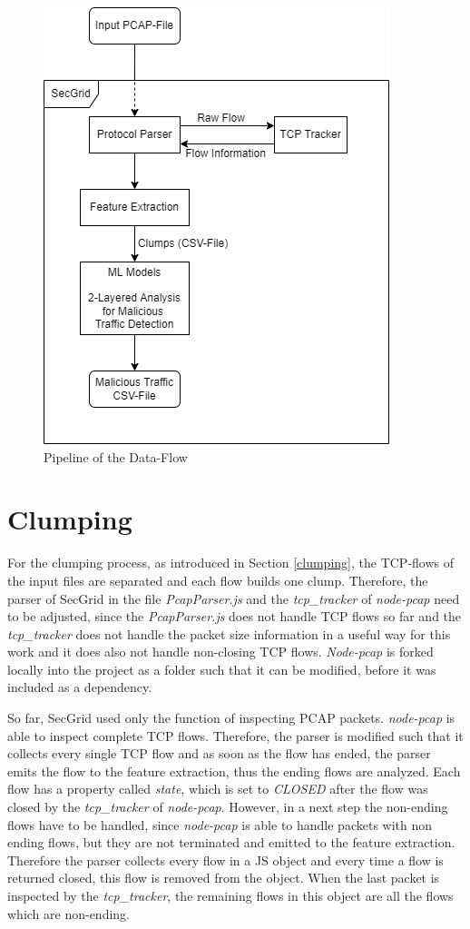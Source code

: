 \begin{figure} [h]
\includegraphics[scale=0.5]{images/pipeline.png}
\centering
\caption{Pipeline of the Data-Flow}
\label{fig:pipeline}
\end{figure}

\section{Clumping} \label{impl_clumping}
For the clumping process, as introduced in Section \ref{clumping}, the TCP-flows of the input files are separated and each flow builds one clump. Therefore, the parser of SecGrid in the file \textit{PcapParser.js} and the \textit{tcp\_tracker} of \textit{node-pcap} need to be adjusted, since the \textit{PcapParser.js} does not handle TCP flows so far and the \textit{tcp\_tracker} does not handle the packet size information in a useful way for this work and it does also not handle non-closing TCP flows. \textit{Node-pcap} is forked locally into the project as a folder such that it can be modified, before it was included as a dependency. 

So far, SecGrid used only the function of inspecting PCAP packets. \textit{node-pcap} is able to inspect complete TCP flows. Therefore, the parser is modified such that it collects every single TCP flow and as soon as the flow has ended, the parser emits the flow to the feature extraction, thus the ending flows are analyzed. Each flow has a property called \textit{state}, which is set to \textit{CLOSED} after the flow was closed by the \textit{tcp\_tracker} of \textit{node-pcap}. However, in a next step the non-ending flows have to be handled, since \textit{node-pcap} is able to handle packets with non ending flows, but they are not terminated and emitted to the feature extraction. Therefore the parser collects every flow in a JS object and every time a flow is returned closed, this flow is removed from the object. When the last packet is inspected by the \textit{tcp\_tracker}, the remaining flows in this object are all the flows which are non-ending. 

